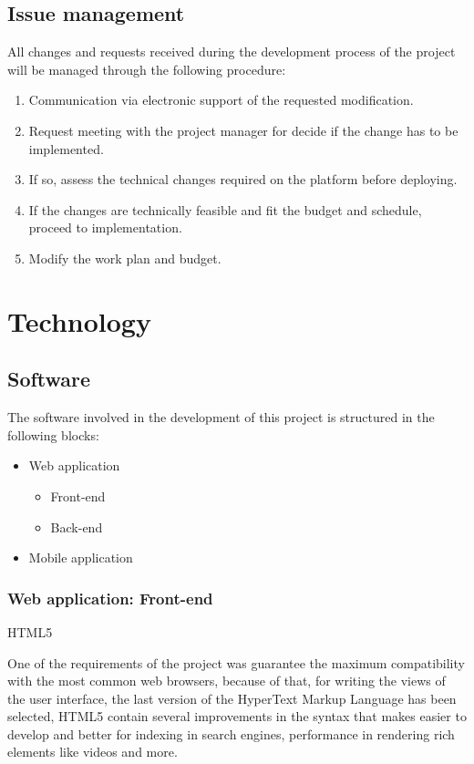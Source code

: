 \documentclass{DeustoFDP}
\begin{document}
\subsection{Issue management}
All changes and requests received during the development process of the project will be managed through the following procedure:
\begin{enumerate}
	\item Communication via electronic support of the requested modification.
	\item Request meeting with the project manager for decide if the change has to be implemented.
	\item If so, assess the technical changes required on the platform before deploying.
	\item If the changes are technically feasible and fit the budget and schedule, proceed to implementation.
	\item Modify the work plan and budget.
\end{enumerate}
\section{Technology}
\subsection{Software}
The software involved in the development of this project is structured in the following blocks:
\begin{itemize}
	\item Web application
	\begin{itemize}
		\item Front-end
		\item Back-end
	\end{itemize}
	\item Mobile application
\end{itemize}

\subsubsection{Web application: Front-end}
{\large HTML5}

One of the requirements of the project was guarantee the maximum compatibility with the most common web browsers, because of that, for writing the views of the user interface, the last version of the HyperText Markup Language has been selected, HTML5 contain several improvements in the syntax that makes easier to develop and better for indexing in search engines, performance in rendering rich elements like videos and more.
\end{document}
